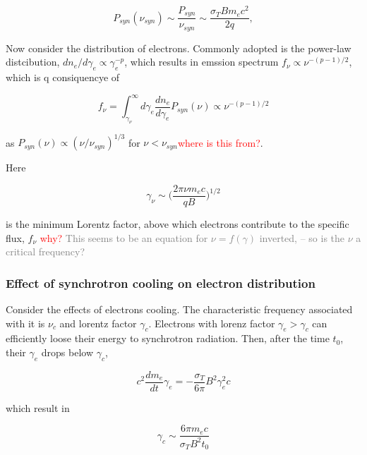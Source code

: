\documentclass[11pt,a4paper,headinclude=true,DIV=14,BCOR=8mm,chapterprefix,listof=totoc,twoside,openright,abstracton]{scrbook}
\newcommand{\red}[1]{\textcolor{red}{#1}}
\newcommand{\gray}[1]{\textcolor{gray}{#1}}
\begin{document}
\begin{equation}
    P_{syn}(\nu_{syn}) \sim \frac{P_{syn}}{\nu_{syn}} \sim \frac{\sigma_T B m_e c^2}{2 q},
\end{equation}

Now consider the distribution of electrons.
Commonly adopted is the power-law distcibution, $dn_e/d\gamma_e \propto \gamma_e^{-p}$, which results in emssion spectrum $f_{\nu}\propto\nu^{-(p-1)/2}$,
which is q consiquencye of 

\begin{equation}
    f_{\nu} = \int_{\gamma_{\nu}}^{\infty} d\gamma_e \frac{dn_e}{d\gamma_e}P_{syn}(\nu) \propto \nu^{-(p-1)/2}
\end{equation}

as $P_{syn}(\nu) \propto (\nu/\nu_{syn})^{1/3}$ for $\nu < \nu_{syn}$\red{where is this from?}.

Here

\begin{equation}
    \gamma_{\nu} \sim \Bigg(\frac{2\pi\nu m_e c}{qB}\Bigg)^{1/2}
\end{equation}

is the minimum Lorentz factor, above which electrons contribute to the specific flux, $f_{\nu}$
\red{why?}
\gray{This seems to be an equation for $\nu = f(\gamma)$ inverted, -- so is the $\nu$ a critical frequency?}


\subsubsection{Effect of synchrotron cooling on electron distribution}

Consider the effects of electrons cooling. 
The characteristic frequency associated with it is $\nu_c$ and lorentz factor $\gamma_c$.
Electrons with lorenz factor $\gamma_e > \gamma_c$ can efficiently loose their energy to synchrotron radiation. Then, after the time $t_0$, their $\gamma_e$ drops below $\gamma_c$, 

\begin{equation}
    c^2 \frac{dm_e}{dt} \gamma_e = -\frac{\sigma_T}{6\pi} B^2 \gamma_e^2 c
\end{equation}

which result in 

\begin{equation}
    \gamma_c \sim \frac{6 \pi m_e c}{\sigma_T B^2 t_0}
\end{equation}
\end{document}
